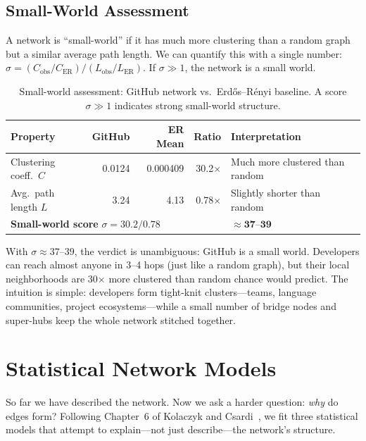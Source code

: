 \documentclass[letterpaper]{article}
\begin{document}
\subsection{Small-World Assessment}

A network is ``small-world'' if it has much more clustering than a random graph but a similar average path length. We can quantify this with a single number: $\sigma = (C_{\text{obs}} / C_{\text{ER}}) / (L_{\text{obs}} / L_{\text{ER}})$. If $\sigma \gg 1$, the network is a small world.

\begin{table}[H]
  \centering
  \begin{tabular}{lrrrl}
    \toprule
    \textbf{Property} & \textbf{GitHub} & \textbf{ER Mean} & \textbf{Ratio} & \textbf{Interpretation} \\
    \midrule
    Clustering coeff.\ $C$  & 0.0124  & 0.000409 & 30.2$\times$ & Much more clustered than random \\
    Avg.\ path length $L$   & 3.24    & 4.13     & 0.78$\times$ & Slightly shorter than random \\
    \midrule
    \multicolumn{4}{l}{\textbf{Small-world score} $\sigma = 30.2 / 0.78$} & $\boldsymbol{\approx 37}$--$\boldsymbol{39}$ \\
    \bottomrule
  \end{tabular}
  \caption{Small-world assessment: GitHub network vs.\ Erd\H{o}s--R{\'e}nyi baseline. A score $\sigma \gg 1$ indicates strong small-world structure.}
  \label{tab:small_world}
\end{table}

With $\sigma \approx 37$--$39$, the verdict is unambiguous: GitHub is a small world. Developers can reach almost anyone in 3--4 hops (just like a random graph), but their local neighborhoods are 30$\times$ more clustered than random chance would predict. The intuition is simple: developers form tight-knit clusters---teams, language communities, project ecosystems---while a small number of bridge nodes and super-hubs keep the whole network stitched together.

\section{Statistical Network Models}

So far we have described the network. Now we ask a harder question: \emph{why} do edges form? Following Chapter~6 of Kolaczyk and Csardi~\cite{kolaczyk2020sand}, we fit three statistical models that attempt to explain---not just describe---the network's structure.
\end{document}
